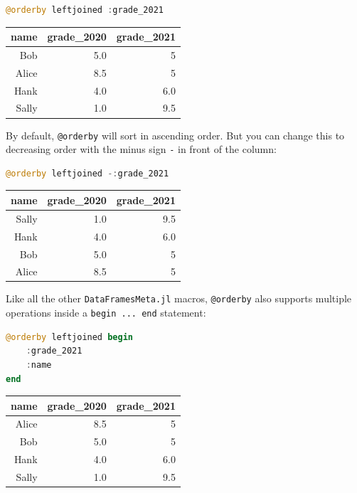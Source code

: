 \documentclass[
  notoc %
]{tufte-book}
\newcommand{\passthrough}[1]{#1}
\begin{document}
\begin{lstlisting}[language=Julia]
@orderby leftjoined :grade_2021
\end{lstlisting}

\begin{longtable}[]{@{}rrr@{}}
\toprule
name & grade\_2020 & grade\_2021 \\
\midrule
\endhead
Bob & 5.0 & 5 \\
Alice & 8.5 & 5 \\
Hank & 4.0 & 6.0 \\
Sally & 1.0 & 9.5 \\
\bottomrule
\end{longtable}

By default, \passthrough{\lstinline!@orderby!} will sort in ascending
order. But you can change this to decreasing order with the minus sign
\passthrough{\lstinline!-!} in front of the column:

\begin{lstlisting}[language=Julia]
@orderby leftjoined -:grade_2021
\end{lstlisting}

\begin{longtable}[]{@{}rrr@{}}
\toprule
name & grade\_2020 & grade\_2021 \\
\midrule
\endhead
Sally & 1.0 & 9.5 \\
Hank & 4.0 & 6.0 \\
Bob & 5.0 & 5 \\
Alice & 8.5 & 5 \\
\bottomrule
\end{longtable}

Like all the other \passthrough{\lstinline!DataFramesMeta.jl!} macros,
\passthrough{\lstinline!@orderby!} also supports multiple operations
inside a \passthrough{\lstinline!begin ... end!} statement:

\begin{lstlisting}[language=Julia]
@orderby leftjoined begin
    :grade_2021
    :name
end
\end{lstlisting}

\begin{longtable}[]{@{}rrr@{}}
\toprule
name & grade\_2020 & grade\_2021 \\
\midrule
\endhead
Alice & 8.5 & 5 \\
Bob & 5.0 & 5 \\
Hank & 4.0 & 6.0 \\
Sally & 1.0 & 9.5 \\
\bottomrule
\end{longtable}
\end{document}
